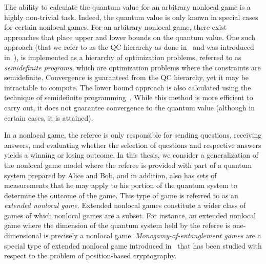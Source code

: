 The ability to calculate the quantum value for an arbitrary nonlocal game is a highly non-trivial task. Indeed, the quantum value is only known in special cases for certain nonlocal games. For an arbitrary nonlocal game, there exist approaches that place upper and lower bounds on the quantum value. One such approach (that we refer to as the QC hierarchy as done in~\cite{Coudron2015} and was introduced in~\cite{Doherty2008, Navascues2007}), is implemented as a hierarchy of optimization problems, referred to as \emph{semidefinite programs}, which are optimization problems where the constraints are semidefinite. Convergence is guaranteed from the QC hierarchy, yet it may be intractable to compute. The lower bound approach is also calculated using the technique of semidefinite programming~\cite{Liang2007}. While this method is more efficient to carry out, it does not guarantee convergence to the quantum value (although in certain cases, it is attained). 

In a nonlocal game, the referee is only responsible for sending questions, receiving answers, and evaluating whether the selection of questions and respective answers yields a winning or losing outcome. In this thesis, we consider a generalization of the nonlocal game model where the referee is provided with part of a quantum system prepared by Alice and Bob, and in addition, also has sets of measurements that he may apply to his portion of the quantum system to determine the outcome of the game. This type of game is referred to as an \emph{extended nonlocal game}. Extended nonlocal games constitute a wider class of games of which nonlocal games are a subset. For instance, an extended nonlocal game where the dimension of the quantum system held by the referee is one-dimensional is precisely a nonlocal game. \emph{Monogamy-of-entanglement games} are a special type of extended nonlocal game introduced in~\cite{Tomamichel2013} that has been studied with respect to the problem of position-based cryptography. 


